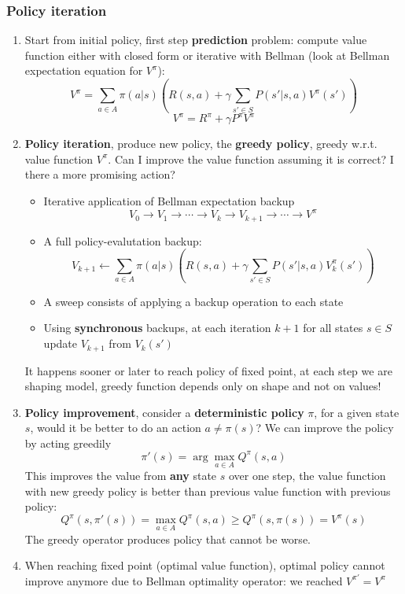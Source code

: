 \subsubsection{Policy iteration}
    \begin{enumerate}
        \item Start from initial policy, first step \textbf{prediction} problem: compute value function either with closed form or iterative with Bellman (look at Bellman expectation equation for $V^\pi$):
        $$V^\pi=\sum_{a \in A}\pi(a|s)\left(R(s,a)+\gamma\sum_{s'\in S}P(s'|s,a)V^\pi(s')\right)$$
        $$V^\pi=R^\pi+\gamma P^\pi V^\pi$$
        \item \textbf{Policy iteration}, produce new policy, the \textbf{greedy policy}, greedy w.r.t. value function $V^\pi$. Can I improve the value function assuming it is correct? I there a more promising action?
        \begin{itemize}
            \item Iterative application of Bellman expectation backup
            $$V_0\rightarrow V_1\rightarrow \cdots \rightarrow V_k \rightarrow V_{k+1} \rightarrow \cdots \rightarrow V^\pi$$
            \item A full policy-evalutation backup:
            $$V_{k+1}\leftarrow\sum_{a \in A}\pi(a|s)\left(R(s,a)+\gamma\sum_{s'\in S}P(s'|s,a)V_k^\pi(s')\right)$$
            \item A sweep consists of applying a backup operation to each state
            \item Using \textbf{synchronous} backups, at each iteration $k+1$ for all states $s \in S$ update $V_{k+1}$ from $V_k(s')$
        \end{itemize}
        It happens sooner or later to reach policy of fixed point, at each step we are shaping model, greedy function depends only on shape and not on values!
        \item \textbf{Policy improvement}, consider a \textbf{deterministic policy} $\pi$, for a given state $s$, would it be better to do an action $a\neq\pi(s)$? We can improve the policy by acting greedily
        $$\pi'(s)=\arg\max_{a \in A}Q^\pi(s,a)$$
        This improves the value from \textbf{any} state $s$ over one step, the value function with new greedy policy is better than previous value function with previous policy:
        $$Q^\pi(s,\pi'(s))=\max_{a \in A}Q^\pi(s,a) \geq Q^\pi(s,\pi(s))=V^\pi(s)$$
        The greedy operator produces policy that cannot be worse.
        \item When reaching fixed point (optimal value function), optimal policy cannot improve anymore due to Bellman optimality operator: we reached $V^{\pi'}=V^\pi$

\end{enumerate}
